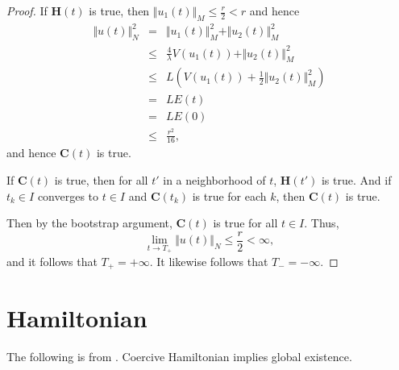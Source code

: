 \documentclass{article}
\newcommand{\norm}[1]{\Vert #1 \Vert}
\begin{document}
\begin{proof}
If $\mathbf{H}(t)$ is true, then $\norm{u_1(t)}_M \leq \frac{r}{2}<r$ and hence
\begin{eqnarray*}
\norm{u(t)}_N^2&=&\norm{u_1(t)}_M^2+\norm{u_2(t)}_M^2\\
&\leq&\frac{4}{\lambda}V(u_1(t))+\norm{u_2(t)}_M^2\\
&\leq&L\left(V(u_1(t))+\frac{1}{2}\norm{u_2(t)}_M^2\right)\\
&=&LE(t)\\
&=&LE(0)\\
&\leq&\frac{r^2}{16},
\end{eqnarray*}
and hence $\mathbf{C}(t)$ is true.

If $\mathbf{C}(t)$ is true, then for all $t'$ in a neighborhood of $t$, $\mathbf{H}(t')$ is true. And if $t_k \in I$ converges to $t \in I$ and $\mathbf{C}(t_k)$ is true for each $k$, then 
$\mathbf{C}(t)$ is true.

Then by the bootstrap argument, $\mathbf{C}(t)$ is true for all $t \in I$. Thus,
\[
\lim_{t \to T_+} \norm{u(t)}_N \leq \frac{r}{2}<\infty,
\]
and it follows that $T_+=+\infty$. It likewise  follows that $T_-=-\infty$.
\end{proof}


\section{Hamiltonian}


The following is from \cite[p.~32, Exercise 1.29]{tao}. Coercive Hamiltonian implies global existence.
\end{document}
